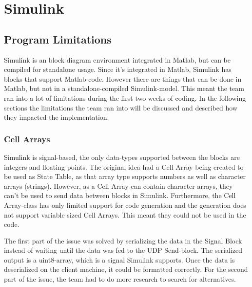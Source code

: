 \section{Simulink}\label{sec:simulink}

\subsection{Program Limitations}\label{sec:simprolim}
Simulink is an block diagram environment integrated in Matlab, but can be compiled for standalone usage. Since it's integrated in Matlab, Simulink has blocks that support Matlab-code. However there are things that can be done in Matlab, but not in a standalone-compiled Simulink-model. This meant the team ran into a lot of limitations during the first two weeks of coding. In the following sections the limitations the team ran into will be discussed and described how they impacted the implementation.

\subsubsection{Cell Arrays}
Simulink is signal-based, the only data-types supported between the blocks are integers and floating points. The original idea had a Cell Array being created to be used as State Table, as that array type supports numbers as well as character arrays (strings). However, as a Cell Array can contain character arrays, they can't be used to send data between blocks in Simulink. Furthermore, the Cell Array-class has only limited support for code generation and the generation does not support variable sized Cell Arrays. This meant they could not be used in the code.

The first part of the issue was solved by serializing the data in the Signal Block instead of waiting until the data was fed to the UDP Send-block. The serialized output is a uint8-array, which is a signal Simulink supports. Once the data is deserialized on the client machine, it could be formatted correctly. For the second part of the issue, the team had to do more research to search for alternatives.


